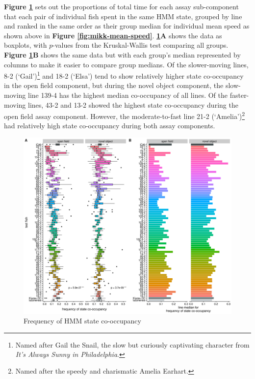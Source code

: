 \documentclass[
]{book}
\begin{document}
\textbf{Figure \ref{fig:F0-sge-cooc-box}} sets out the proportions of total time for each assay sub-component that each pair of individual fish spent in the same HMM state, grouped by line and ranked in the same order as their group median for individual mean speed as shown above in \textbf{Figure \ref{fig:mikk-mean-speed}}. \textbf{\ref{fig:F0-sge-cooc-box}A} shows the data as boxplots, with \(p\)-values from the Kruskal-Wallis test comparing all groups. \textbf{Figure \ref{fig:F0-sge-cooc-box}B} shows the same data but with each group's median represented by columns to make it easier to compare group medians. Of the slower-moving lines, \textcolor{8-2 (‘Gail’)_FF699C}{8-2 (‘Gail’)}\footnote{Named after Gail the Snail, the slow but curiously captivating character from \emph{It's Always Sunny in Philadelphia}.} and \textcolor{18-2 (‘Elsa’)_FF66A6}{18-2 (‘Elsa’)} tend to show relatively higher state co-occupancy in the open field component, but during the novel object component, the slow-moving line \textcolor{139-4_FF61CC}{139-4} has the highest median co-occupancy of all lines. Of the faster-moving lines, \textcolor{43-2_F17D50}{43-2} and \textcolor{13-2_F57A5F}{13-2} showed the highest state co-occupancy during the open field assay component. However, the moderate-to-fast line \textcolor{21-2 (‘Amelia’)_49B500}{21-2 (‘Amelia’)}\footnote{Named after the speedy and charismatic Amelia Earhart.} had relatively high state co-occupancy during both assay components.



\begin{figure}
\includegraphics[width=1\linewidth]{figs/mikk_behaviour/0.08_15_cooc_box_all} \caption{Frequency of HMM state co-occupancy}\label{fig:F0-sge-cooc-box}
\end{figure}
\end{document}
